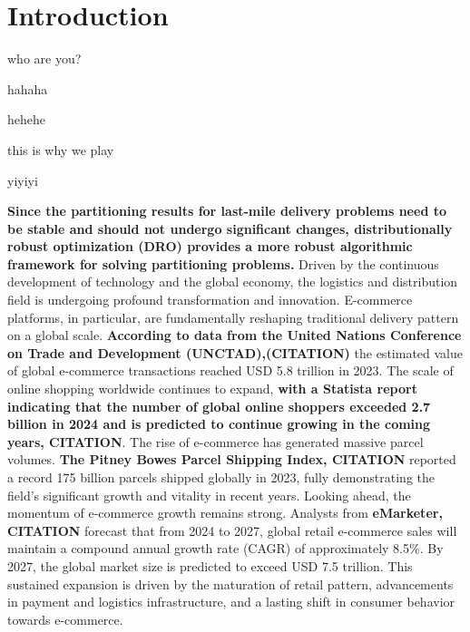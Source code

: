 \documentclass[preprint,12pt,authoryear]{elsarticle}
\begin{document}


\section{Introduction}
\label{sec1}
who are you?

hahaha

hehehe

this is why we play

yiyiyi

\textbf{Since the partitioning results for last-mile delivery problems need to be stable and should not undergo significant changes, distributionally robust optimization (DRO) provides a more robust algorithmic framework for solving partitioning problems.} Driven by the continuous development of technology and the global economy, the logistics and distribution field is undergoing profound transformation and innovation. E-commerce platforms, in particular, are fundamentally reshaping traditional delivery pattern on a global scale. \textbf{According to data from the United Nations Conference on Trade and Development (UNCTAD),(CITATION)} the estimated value of global e-commerce transactions reached USD 5.8 trillion in 2023. The scale of online shopping worldwide continues to expand, \textbf{with a Statista report indicating that the number of global online shoppers exceeded 2.7 billion in 2024 and is predicted to continue growing in the coming years, CITATION}. The rise of e-commerce has generated massive parcel volumes. \textbf{The Pitney Bowes Parcel Shipping Index, CITATION} reported a record 175 billion parcels shipped globally in 2023, fully demonstrating the field's significant growth and vitality in recent years. Looking ahead, the momentum of e-commerce growth remains strong. Analysts from \textbf{eMarketer, CITATION} forecast that from 2024 to 2027, global retail e-commerce sales will maintain a compound annual growth rate (CAGR) of approximately 8.5\%. By 2027, the global market size is predicted to exceed USD 7.5 trillion. This sustained expansion is driven by the maturation of retail pattern, advancements in payment and logistics infrastructure, and a lasting shift in consumer behavior towards e-commerce.
\end{document}
